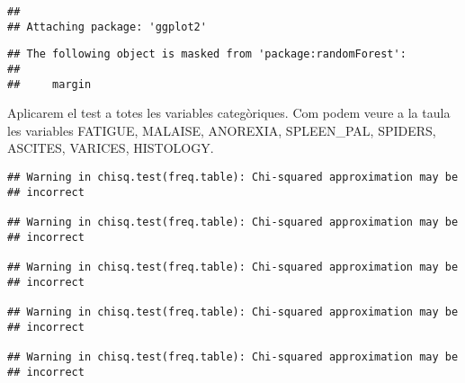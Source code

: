 \documentclass[]{article}
\newenvironment{Shaded}{\begin{snugshade}}{\end{snugshade}}
\newcommand{\ControlFlowTok}[1]{\textcolor[rgb]{0.13,0.29,0.53}{\textbf{#1}}}
\newcommand{\FloatTok}[1]{\textcolor[rgb]{0.00,0.00,0.81}{#1}}
\newcommand{\KeywordTok}[1]{\textcolor[rgb]{0.13,0.29,0.53}{\textbf{#1}}}
\newcommand{\NormalTok}[1]{#1}
\newcommand{\OperatorTok}[1]{\textcolor[rgb]{0.81,0.36,0.00}{\textbf{#1}}}
\newcommand{\OtherTok}[1]{\textcolor[rgb]{0.56,0.35,0.01}{#1}}
\newcommand{\StringTok}[1]{\textcolor[rgb]{0.31,0.60,0.02}{#1}}
\begin{document}
\begin{verbatim}
## 
## Attaching package: 'ggplot2'
\end{verbatim}

\begin{verbatim}
## The following object is masked from 'package:randomForest':
## 
##     margin
\end{verbatim}

Aplicarem el test a totes les variables categòriques. Com podem veure a
la taula les variables FATIGUE, MALAISE, ANOREXIA, SPLEEN\_PAL, SPIDERS,
ASCITES, VARICES, HISTOLOGY.

\begin{Shaded}
\end{Shaded}

\begin{verbatim}
## Warning in chisq.test(freq.table): Chi-squared approximation may be
## incorrect

## Warning in chisq.test(freq.table): Chi-squared approximation may be
## incorrect

## Warning in chisq.test(freq.table): Chi-squared approximation may be
## incorrect

## Warning in chisq.test(freq.table): Chi-squared approximation may be
## incorrect

## Warning in chisq.test(freq.table): Chi-squared approximation may be
## incorrect
\end{verbatim}

\begin{Shaded}
\end{Shaded}
\end{document}
